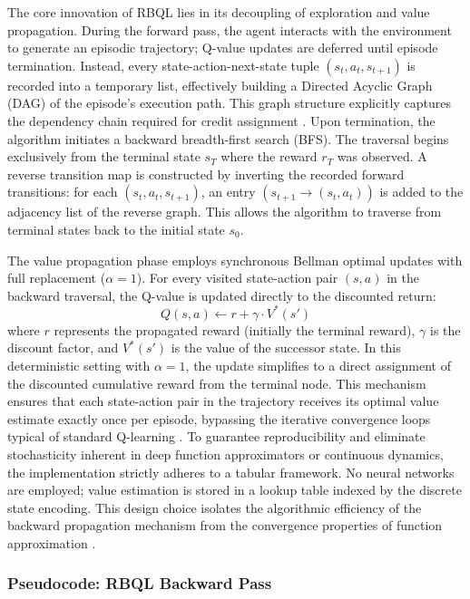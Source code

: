 \documentclass[manuscript, screen, review]{jair}
\begin{document}
The core innovation of RBQL lies in its decoupling of exploration and value propagation. During the forward pass, the agent interacts with the environment to generate an episodic trajectory; Q-value updates are deferred until episode termination. Instead, every state-action-next-state tuple $(s_t, a_t, s_{t+1})$ is recorded into a temporary list, effectively building a Directed Acyclic Graph (DAG) of the episode's execution path. This graph structure explicitly captures the dependency chain required for credit assignment \cite{Diekhoff2024RecursiveBQ}. Upon termination, the algorithm initiates a backward breadth-first search (BFS). The traversal begins exclusively from the terminal state $s_T$ where the reward $r_T$ was observed. A reverse transition map is constructed by inverting the recorded forward transitions: for each $(s_t, a_t, s_{t+1})$, an entry $(s_{t+1} \to (s_t, a_t))$ is added to the adjacency list of the reverse graph. This allows the algorithm to traverse from terminal states back to the initial state $s_0$.

The value propagation phase employs synchronous Bellman optimal updates with full replacement ($\alpha = 1$). For every visited state-action pair $(s, a)$ in the backward traversal, the Q-value is updated directly to the discounted return:
$$Q(s, a) \leftarrow r + \gamma \cdot V^*(s')$$
where $r$ represents the propagated reward (initially the terminal reward), $\gamma$ is the discount factor, and $V^*(s')$ is the value of the successor state. In this deterministic setting with $\alpha=1$, the update simplifies to a direct assignment of the discounted cumulative reward from the terminal node. This mechanism ensures that each state-action pair in the trajectory receives its optimal value estimate exactly once per episode, bypassing the iterative convergence loops typical of standard Q-learning \cite{Meyn2024ThePB}. To guarantee reproducibility and eliminate stochasticity inherent in deep function approximators or continuous dynamics, the implementation strictly adheres to a tabular framework. No neural networks are employed; value estimation is stored in a lookup table indexed by the discrete state encoding. This design choice isolates the algorithmic efficiency of the backward propagation mechanism from the convergence properties of function approximation \cite{Gul2025TheRO}.

\subsubsection{Pseudocode: RBQL Backward Pass}
\end{document}
